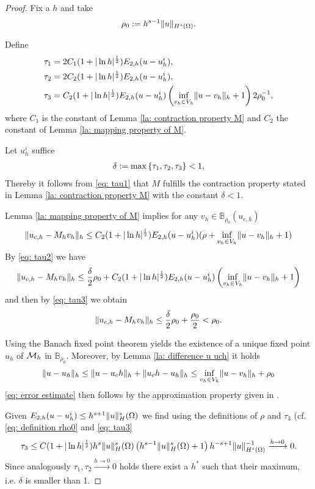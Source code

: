 \begin{proof}
	Fix a $h$ and take
	\begin{align}
		\rho_0:= h^{s-1} \lVert u \rVert_{H^{s}(\Omega)}. \label{eq: definition rho0}
	\end{align}
	
	Define 
	\begin{align}
		\tau_1 &= 2 C_1 (1 + |\ln h|^{\frac 1 2}) E_{2,h}(u-u_h^i), \label{eq: tau1}\\
		\tau_2 & = 2 C_2 (1 + |\ln h|^{\frac 1 2}) E_{2,h}(u-u_h^i), \label{eq: tau2}\\
		\tau_3 & = C_2 (1 + |\ln h|^{\frac 1 2}) E_{2,h}(u-u_h^i) \left(\inf_{v_h \in V_h} \lVert u-v_h \rVert_{h}+1\right) 2 \rho_0^{-1} \label{eq: tau3},
	\end{align}
	where $C_1$ is the constant of Lemma \ref{la: contraction property M} and $C_2$ the constant of Lemma \ref{la: mapping property of M}. 
	
	Let $u_h^i$ suffice
	\begin{align}
		\delta := \operatorname{max} \left\{ \tau_1, \tau_2, \tau_3 \right\} < 1,
	\end{align}
	Thereby it follows from \eqref{eq: tau1} that $M$ fulfills the contraction property stated in Lemma \ref{la: contraction property M} with the constant $\delta<1$.
	
	Lemma \ref{la: mapping property of M} implies for any $v_h \in \mathbb{B}_{\rho_0}(u_{c,h})$
	 \[
	 	\lVert u_{c,h} - M_h v_h \rVert_{h} \leq 
	 		C_2 (1+|\ln h|^{\frac 1 2}) E_{2,h}(u - u^i_h) (\rho+ \inf_{v_h \in V_h} \lVert u-v_h \rVert_{h}+1) 
	 \]
	By \eqref{eq: tau2} we have 
	 \[
	 	\lVert u_{c,h} - M_h v_h \rVert_{h} \leq 
	 		\frac \delta 2 \rho_0 
	 			+ C_2 (1+|\ln h|^{\frac 1 2}) E_{2,h}(u - u^i_h) \left( \inf_{v_h \in V_h} \lVert u-v_h \rVert_{h}+1\right)
	 \]
	 and then by \eqref{eq: tau3} we obtain
	 \[
	 	\lVert u_{c,h} - M_h v_h \rVert_{h} \leq 
	 		\frac \delta 2 \rho_0 
	 		+ \frac {\rho_0} 2  < \rho_0.
	 \]
	 			 	  		 
	 Using the Banach fixed point theorem yields the existence of a unique fixed point $u_h$ of $\mathcal M_h$ in $\mathbb B_{\rho_0}$.
	 Moreover, by Lemma \ref{la: difference u uch} it holds
	 \begin{align}
	 	\lVert u-u_h \rVert_{h} \leq \lVert u-u_ch \rVert_{h} + \lVert u_ch - u_h \rVert_{h} \leq \inf_{v_h \in V_h} \lVert u-v_h \rVert_{h} +\rho_0 
	\end{align}
	\eqref{eq: error estimate} then follows by the approximation property given in .
	
	Given $E_{2,h}(u-u_h^i) \leq h^{s+1} \lVert u \rVert_H^s(\Omega)$ we find using the definitions of $\rho$ and $\tau_3$ (cf. \eqref{eq: definition rho0} and \eqref{eq: tau3}
	\begin{align*}
		\tau_3  \leq C (1 + |\ln h|^{\frac 1 2}) h^{s} \lVert u \rVert_H^s(\Omega) \left(h^{s-1} \lVert u \rVert_H^s(\Omega)+1\right) h^{-s+1} \lVert u \rVert_{H^{s}(\Omega)}^{-1} \xrightarrow{h \rightarrow 0}  0.
	\end{align*}
	Since analogously $\tau_1, \tau_2 \xrightarrow[]{h\rightarrow 0} 0$ holds there exist a $h^*$ such that their maximum, i.e. $\delta$ is smaller than 1.
\end{proof}
